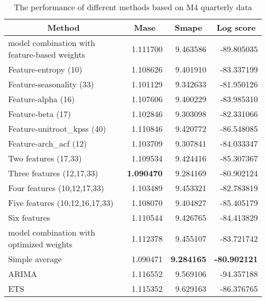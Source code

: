 \documentclass[a4paper,review,11pt,authoryear]{elsarticle}
\begin{document}
\begin{table}[htbp]
	\centering
	\caption{The performance of different methods based on M4 quarterly data}
	\begin{tabular}{lrrr}
		\toprule
		\multicolumn{1}{c}{Method} & \multicolumn{1}{c}{Mase} & \multicolumn{1}{c}{Smape} & \multicolumn{1}{c}{Log score } \\
		\midrule
		\multicolumn{1}{p{22.445em}}{model combination with feature-based weights} & 1.111700 & 9.463586 & -89.805035 \\
		Feature-entropy (10) & 1.108626 & 9.401910 & -83.337199 \\
		Feature-seasonality (33) & 1.101129 & 9.342633 & -81.950126 \\
		Feature-alpha (16) & 1.107606 & 9.400229 & -83.985310 \\
		Feature-beta (17) & 1.102846 & 9.303098 & -82.331066 \\
		Feature-unitroot\_kpss (40) & 1.110846 & 9.420772 & -86.548085 \\
		Feature-arch\_acf (12) & 1.103709 & 9.307841 & -84.033347 \\
		Two features (17,33) & 1.109534 & 9.424416 & -85.307367 \\
		Three features (12,17,33) & \textbf{1.090470} & 9.284169 & -80.902124 \\
		Four features (10,12,17,33) & 1.103489 & 9.453321 & -82.783819 \\
		Five features (10,12,16,17,33) & 1.108070 & 9.404827 & -85.405179 \\
		Six features & 1.110544 & 9.426765 & -84.413829 \\
		\multicolumn{1}{p{22.445em}}{model combination with optimized weights} & 1.112378 & 9.455107 & -83.721742 \\
		\multicolumn{1}{p{22.445em}}{Simple average} & 1.090471 & \textbf{9.284165} & \textbf{-80.902121} \\
		ARIMA & 1.116552 & 9.569106 & -94.357188 \\
		ETS   & 1.115352 & 9.629163 & -86.376765 \\
		\bottomrule
	\end{tabular}%
	\label{tab:addlabel}%
\end{table}%
\end{document}
